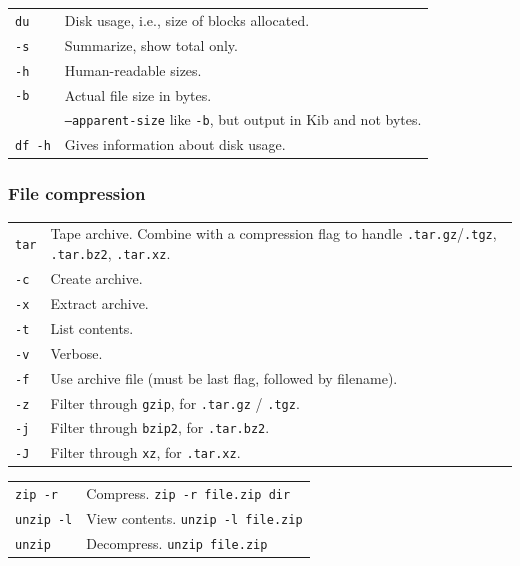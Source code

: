 \begin{tabularx}{\linewidth}{lX}
    \texttt{du}                     & Disk usage, i.e., size of blocks allocated.\\ 
    \texttt{-s}                     & Summarize, show total only.\\
    \texttt{-h}                     & Human-readable sizes.\\
    \texttt{-b}                     & Actual file size in bytes.\\
                                    & \texttt{--apparent-size} like \texttt{-b}, but output in Kib and not bytes.\\
    \texttt{df -h}                  & Gives information about disk usage.\\
    \hline

\end{tabularx}


\subsubsection{File compression}


\begin{tabularx}{\linewidth}{lX}

    \texttt{tar}            & Tape archive. Combine with a compression flag to handle \texttt{.tar.gz}/\texttt{.tgz}, \texttt{.tar.bz2}, \texttt{.tar.xz}.\\
    \texttt{-c}             & Create archive.\\
    \texttt{-x}             & Extract archive.\\
    \texttt{-t}             & List contents.\\
    \texttt{-v}             & Verbose.\\
    \texttt{-f}             & Use archive file (must be last flag, followed by filename).\\
    \texttt{-z}             & Filter through \texttt{gzip}, for \texttt{.tar.gz} / \texttt{.tgz}.\\
    \texttt{-j}             & Filter through \texttt{bzip2}, for \texttt{.tar.bz2}.\\
    \texttt{-J}             & Filter through \texttt{xz}, for \texttt{.tar.xz}.\\
    \hline
\end{tabularx}



\vfill\null
\columnbreak

\begin{tabularx}{\linewidth}{lX}
    \texttt{zip -r}         & Compress. \texttt{zip -r file.zip dir}\\
    \texttt{unzip -l}       & View contents. \texttt{unzip -l file.zip}\\
    \texttt{unzip}          & Decompress. \texttt{unzip file.zip}\\
\end{tabularx}

